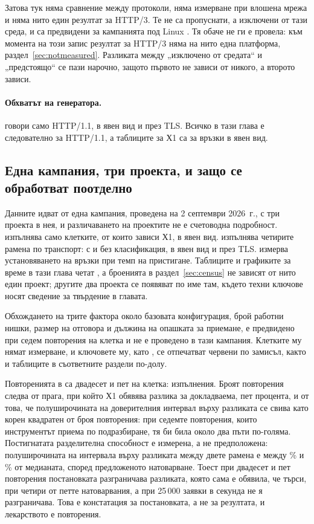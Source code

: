 Затова тук няма сравнение между протоколи, няма измерване при влошена мрежа и няма нито един
резултат за HTTP/3. Те не са пропуснати, а изключени от тази среда, и са предвидени за кампанията
под Linux . Тя обаче не ги е провела: към момента на този запис
резултат за HTTP/3 няма на нито една платформа, раздел~\ref{sec:notmeasured}. Разликата между
„изключено от средата“ и „предстоящо“ се пази нарочно, защото първото не зависи от никого, а
второто зависи.

\paragraph{Обхватът на генератора.}  говори само HTTP/1.1, в явен вид и през
TLS. Всичко в тази глава е следователно за HTTP/1.1, а таблиците за Х1 са за връзки в явен
вид.

\subsection{Една кампания, три проекта, и защо се обработват поотделно}
\label{sec:campaigns}

Данните идват от една кампания, проведена на 2 септември 2026~г., с три проекта в нея, и
различаването на проектите не е счетоводна подробност.  изпълнява само
клетките, от които зависи Х1, в явен вид.  изпълнява четирите рамена по
транспорт: с и без класификация, в явен вид и през TLS.  измерва установяването
на връзки при темп на пристигане. Таблиците и графиките за време в тази глава четат
, а броенията в раздел~\ref{sec:census} не зависят от нито един проект;
другите два проекта се появяват по име там, където техни ключове носят сведение за
твърдение в главата.

Обхождането на трите фактора около базовата конфигурация, брой работни нишки, размер на
отговора и дължина на опашката за приемане, е предвидено при седем повторения на клетка и
не е проведено в тази кампания. Клетките му нямат измерване, и ключовете му, като
, се отпечатват червени по замисъл, както и таблиците в
съответните раздели по-долу.

Повторенията в  са двадесет и пет на клетка:  изпълнения.
Броят повторения следва от прага, при който Х1 обявява разлика за докладваема, пет процента,
и от това, че полуширочината на доверителния интервал върху разликата се свива като корен
квадратен от броя повторения: при седемте повторения, които инструментът приема по
подразбиране, тя би била около два пъти по-голяма. Постигнатата разделителна способност е
измерена, а не предположена: полуширочината на интервала върху разликата между двете рамена
е между \% и \% от медианата,
според предложеното натоварване. Тоест при двадесет и пет повторения постановката
разграничава разликата, която сама е обявила, че търси, при четири от петте натоварвания, а
при 25\,000 заявки в секунда не я разграничава. Това е констатация за постановката, а не за
резултата, и лекарството е повторения.

